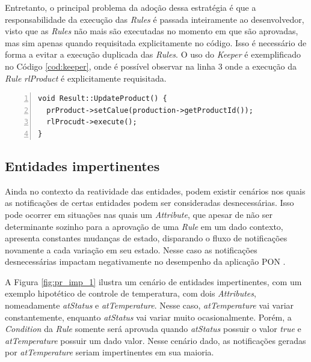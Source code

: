 Entretanto, o principal problema da adoção dessa estratégia é que a
responsabilidade da execução das \textit{Rules} é passada inteiramente ao
desenvolvedor, visto que as \textit{Rules} não mais são executadas no momento em
que são aprovadas, mas sim apenas quando requisitada explicitamente no código.
Isso é necessário de forma a evitar a execução duplicada das \textit{Rules}. O
uso do \textit{Keeper} é exemplificado no Código \ref{cod:keeper}, onde é
possível observar na linha 3 onde a execução da \textit{Rule} \textit{rlProduct}
é explicitamente requisitada.

\begin{lstlisting}[numbers=left,
  stepnumber=1, caption = {Exemplo de
  uso do padrão \textit{Keeper}}, float=htb, source = {Adaptado de \citeonline{muchalski_2012}}, label =
  {cod:keeper}]
void Result::UpdateProduct() {
  prProduct->setCalue(production->getProductId());
  rlProcudt->execute();
}
\end{lstlisting}


\subsection{Entidades impertinentes}

Ainda no contexto da reatividade das entidades, podem existir cenários nos quais
as notificações de certas entidades podem ser consideradas desnecessárias. Isso
pode ocorrer em situações nas quais um \textit{Attribute}, que apesar de não ser
determinante sozinho para a aprovação de uma \textit{Rule} em um dado contexto,
apresenta constantes mudanças de estado, disparando o fluxo de notificações
novamente a cada variação em seu estado. Nesse caso as notificações
desnecessárias impactam negativamente no desempenho da aplicação PON
\cite{msc_Ronszcka_2012}.

A Figura \ref{fig:pr_imp_1} ilustra um cenário de entidades impertinentes, com
um exemplo hipotético de controle de temperatura, com dois \textit{Attributes},
nomeadamente \textit{atStatus} e \textit{atTemperature}. Nesse caso,
\textit{atTemperature} vai variar constantemente, enquanto \textit{atStatus} vai
variar muito ocasionalmente. Porém, a \textit{Condition} da \textit{Rule} somente
será aprovada quando \textit{atStatus} possuir o valor \textit{true} e
\textit{atTemperature} possuir um dado valor. Nesse cenário dado, as
notificações geradas por \textit{atTemperature} seriam impertinentes em sua
maioria.

